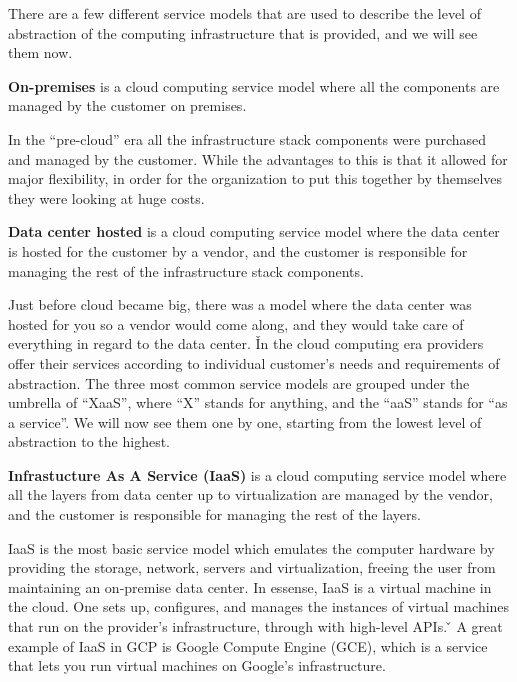 There are a few different service models that are used to describe the level of abstraction of the computing
infrastructure that is provided, and we will see them now.

\bd[On-Premises]
\textbf{On-premises} is a cloud computing service model where all the components are managed by the customer on
premises.
\ed

In the ``pre-cloud'' era all the infrastructure stack components were purchased and managed by the customer. While
the advantages to this is that it allowed for major flexibility, in order for the organization to put this together
by themselves they were looking at huge costs.

\textbf{Data center hosted} is a cloud computing service model where the data center is hosted for the customer by a
vendor, and the customer is responsible for managing the rest of the infrastructure stack components.
\ed

Just before cloud became big, there was a model where the data center was hosted for you so a vendor would come along,
and they would take care of everything in regard to the data center. \v

In the cloud computing era providers offer their services according to individual customer's needs and requirements
of abstraction. The three most common service models are grouped under the umbrella of ``XaaS'', where ``X'' stands
for anything, and the ``aaS'' stands for ``as a service''. We will now see them one by one, starting from the lowest
level of abstraction to the highest.

\textbf{Infrastucture As A Service (IaaS)} is a cloud computing service model where all the layers from data center
up to virtualization are managed by the vendor, and the customer is responsible for managing the rest of the layers.
\ed

IaaS is the most basic service model which emulates the computer hardware by providing the storage, network, servers and
virtualization, freeing the user from maintaining an on-premise data center. In essense, IaaS is a virtual machine in
the cloud. One sets up, configures, and manages the instances of virtual machines that run on the provider's
infrastructure, through with high-level APIs. \v

\be
A great example of IaaS in GCP is Google Compute Engine (GCE), which is a service that lets you run virtual machines on
Google's infrastructure.
\ee

